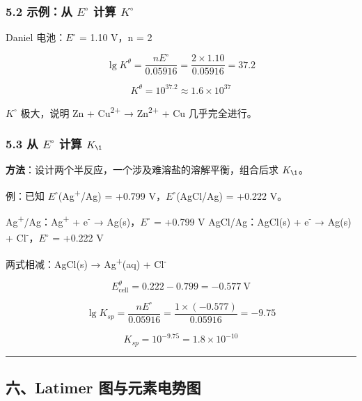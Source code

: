 \subsubsection{\texorpdfstring{5.2 示例：从 \(E^{\circ}\) 计算 \(K^{\circ}\)}{5.2 示例：从 E\^{}\{\textbackslash circ\} 计算 K\^{}\{\textbackslash circ\}}}\label{ux793aux4f8bux4ece-ecirc-ux8ba1ux7b97-kcirc}

Daniel 电池：\(E^{\circ}\) = 1.10 V，n = 2

\[
\lg K^\theta = \frac{nE^\circ}{0.05916} = \frac{2 \times 1.10}{0.05916} = 37.2
\]

\[
K^\theta = 10^{37.2} \approx 1.6 \times 10^{37}
\]

\(K^{\circ}\) 极大，说明 Zn + Cu\textsuperscript{2+} → Zn\textsuperscript{2+} + Cu 几乎完全进行。

\subsubsection{\texorpdfstring{5.3 从 \(E^{\circ}\) 计算 \(K_{\1}\)}{5.3 从 E\^{}\{\textbackslash circ\} 计算 K\_\{\textbackslash1\}}}\label{ux4ece-ecirc-ux8ba1ux7b97-k_1}

\textbf{方法}：设计两个半反应，一个涉及难溶盐的溶解平衡，组合后求 \(K_{\1}\)。

例：已知 \(E^{\circ}\)(Ag\textsuperscript{+}/Ag) = +0.799 V，\(E^{\circ}\)(AgCl/Ag) = +0.222 V。

Ag\textsuperscript{+}/Ag：Ag\textsuperscript{+} + e\textsuperscript{-} → Ag(s)，\(E^{\circ}\) = +0.799 V
AgCl/Ag：AgCl(s) + e\textsuperscript{-} → Ag(s) + Cl\textsuperscript{-}，\(E^{\circ}\) = +0.222 V

两式相减：AgCl(s) → Ag\textsuperscript{+}(aq) + Cl\textsuperscript{-}

\[E_{\text{cell}}^\theta = 0.222 - 0.799 = -0.577\ \mathrm{V}\]

\[\lg K_{sp} = \frac{nE^\circ}{0.05916} = \frac{1 \times (-0.577)}{0.05916} = -9.75\]

\[K_{sp} = 10^{-9.75} = 1.8 \times 10^{-10}\]

\begin{center}\rule{0.5\linewidth}{0.5pt}\end{center}

\subsection{六、Latimer 图与元素电势图}\label{ux516dlatimer-ux56feux4e0eux5143ux7d20ux7535ux52bfux56fe}

